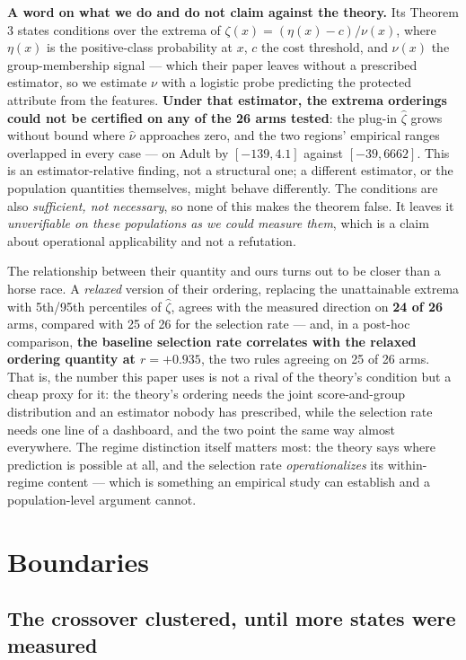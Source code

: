 \documentclass[9pt,conference]{IEEEtran}
\begin{document}
\textbf{A word on what we do and do not claim against the theory.} Its Theorem 3 states
conditions over the extrema of $\zeta(x) = (\eta(x)-c)/\nu(x)$, where $\eta(x)$ is the
positive-class probability at $x$, $c$ the cost threshold, and $\nu(x)$ the group-membership
signal --- which their paper leaves without a prescribed estimator, so we estimate $\nu$
with a logistic probe predicting the protected attribute from the features. \textbf{Under
that estimator, the extrema orderings could not be certified on any of the 26 arms tested}:
the plug-in $\hat\zeta$ grows without bound where $\hat\nu$ approaches zero, and the two
regions' empirical ranges overlapped in every case --- on Adult by $[-139, 4.1]$ against
$[-39, 6662]$. This is an estimator-relative finding, not a structural one; a different
estimator, or the population quantities themselves, might behave differently. The
conditions are also \emph{sufficient, not necessary}, so none of this makes the theorem
false. It leaves it \emph{unverifiable on these populations as we could measure them},
which is a claim about operational applicability and not a refutation.

The relationship between their quantity and ours turns out to be closer than a horse race.
A \emph{relaxed} version of their ordering, replacing the unattainable extrema with
5th/95th percentiles of $\hat\zeta$, agrees with the measured direction on \textbf{24 of
26} arms, compared with 25 of 26 for the selection rate --- and, in a post-hoc comparison,
\textbf{the baseline selection rate correlates with the relaxed ordering quantity at
$r = +0.935$}, the two rules agreeing on 25 of 26 arms. That is, the number this
paper uses is not a rival of the theory's condition but a cheap proxy for it: the theory's
ordering needs the joint score-and-group distribution and an estimator nobody has
prescribed, while the selection rate needs one line of a dashboard, and the two point the
same way almost everywhere. The regime distinction itself matters most: the theory says
where prediction is possible at all, and the selection rate \emph{operationalizes} its
within-regime content --- which is something an empirical study can establish and a
population-level argument cannot.

\section{Boundaries}
\label{sec:boundaries}

\subsection{The crossover clustered, until more states were measured}
\end{document}
